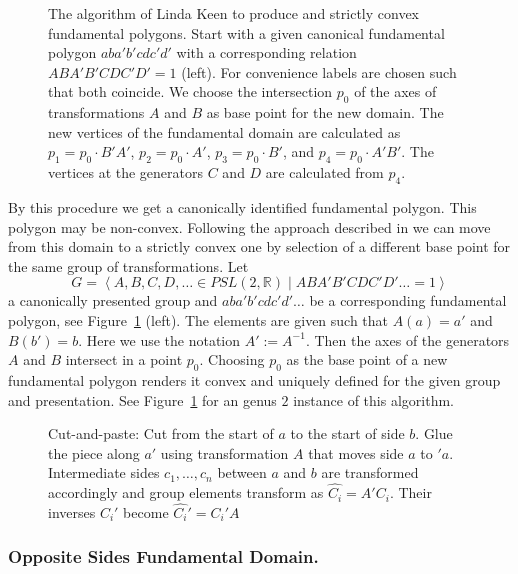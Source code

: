 \documentclass[Thesis.tex]{subfiles}
\begin{document}
  \begin{figure}
  \centering
  \caption{The algorithm of Linda Keen to produce and strictly convex fundamental polygons. Start with a given canonical fundamental polygon $aba'b'cdc'd'$ with a corresponding relation $ABA'B'CDC'D'=1$ (left). For convenience labels are chosen such that both coincide. We choose the intersection $p_0$ of the axes of transformations $A$ and $B$ as base point for the new domain. The new vertices of the fundamental domain are calculated as $p_1=p_0\cdot B'A'$, $p_2=p_0\cdot A'$, $p_3=p_0\cdot B'$, and $p_4=p_0\cdot A'B'$. The vertices at the generators $C$ and $D$ are calculated from $p_4$.}
  \label{fig:keen_polygon}
  \end{figure}

  By this procedure we get a canonically identified fundamental polygon. This polygon may be non-convex. Following the approach described in \cite{keen1966} we can move from this domain to a strictly convex one by selection of a different base point for the same group of transformations. Let
  \[G=\left<A,B,C,D,\ldots\in \mathit{PSL}(2,\mathbb R)\mid ABA'B'CDC'D'\ldots=1\right>\]
  a canonically presented group and $aba'b'cdc'd'\ldots$ be a corresponding fundamental polygon, see Figure~\ref{fig:keen_polygon} (left). The elements are given such that $A(a)=a'$ and $B(b')=b$. Here we use the notation $A':=A^{-1}$. Then the axes of the generators $A$ and $B$ intersect in a point $p_0$. Choosing $p_0$ as the base point of a new fundamental polygon renders it convex and uniquely defined for the given group and presentation. See Figure~\ref{fig:keen_polygon} for an genus $2$ instance of this algorithm.

  \begin{figure}
  \centering
  \resizebox{0.5\textwidth}{!} {
  
  }
  \caption{Cut-and-paste: Cut from the start of $a$ to the start of side $b$. Glue the piece along $a'$ using transformation $A$ that moves side $a$ to $'a$. Intermediate sides $c_1,\ldots,c_n$ between $a$ and $b$ are transformed accordingly and group elements transform as $\hat{C_i}=A'C_i$. Their inverses $C_i'$ become $\hat{C_i}'=C_i'A$}
  \label{fig:cut-and-paste-canonical}
  \end{figure}

  \subsubsection*{Opposite Sides Fundamental Domain.}
\end{document}
